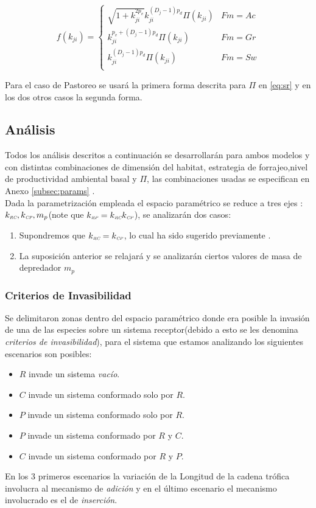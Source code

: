 \begin{equation}\label{eq:fkr}
f(k_{ji}) = 
\begin{cases}
\sqrt{1+k_{ji}^{2p_v}}k_{ji}^{(D_j-1)p_d} \Pi(k_{ji}) & Fm = Ac\\
k_{ji}^{p_v+(D_j-1)p_d}\Pi(k_{ji}) & Fm =Gr\\
k_{ji}^{(D_j-1)p_d}\Pi(k_{ji}) & Fm = Sw\\
\end{cases}
\end{equation}

Para el caso de Pastoreo se usar\'a la primera forma descrita para $\Pi$ en \eqref{eq:sr} y en los dos otros casos la segunda forma.

\subsection{An\'alisis}
Todos los an\'alisis descritos a continuaci\'on se desarrollar\'an para ambos modelos y con distintas combinaciones de dimensi\'on del habitat, estrategia de forrajeo,nivel de productividad ambiental basal y $\Pi$, las combinaciones usadas se especifican en Anexo \ref{subsec:params} .\\
Dada la parametrizaci\'on empleada el espacio param\'etrico se reduce a tres ejes : $k_{\textit{\tiny RC}},k_{\textit{\tiny CP}}, m_p$(note que $k_{\textit{\tiny RP}} = k_{\textit{\tiny RC}} k_{\textit{\tiny CP}}$), se analizar\'an dos casos:
\begin{enumerate}
\item Supondremos que $k_{\textit{\tiny RC}} = k_{\textit{\tiny CP}}$, lo cual ha sido sugerido previamente \citep{peters1986ecological,brown2004toward}.\label{equalsizeratios}
\item La suposici\'on anterior se relajar\'a y se analizar\'an ciertos valores de masa de depredador $m_p$
\end{enumerate}

\subsubsection{Criterios de Invasibilidad}
Se delimitaron zonas dentro del espacio param\'etrico donde era posible la invasi\'on de una de las especies sobre un sistema receptor(debido a esto se les denomina \emph{criterios de invasibilidad}), para el sistema que estamos analizando los siguientes escenarios son posibles: 
\begin{itemize}
\item $R$ invade un sistema \emph{vac\'io}.
\item $C$ invade un sistema conformado solo por $R$.
\item $P$ invade un sistema conformado solo por $R$.
\item $P$ invade un sistema conformado por $R$ y $C$.
\item $C$ invade un sistema conformado por $R$ y $P$.
\end{itemize}
En los 3 primeros escenarios la variaci\'on de la Longitud de la cadena tr\'ofica involucra al mecanismo de \textit{adici\'on} y en el \'ultimo escenario el mecanismo involucrado es el de \textit{inserci\'on}.\\

